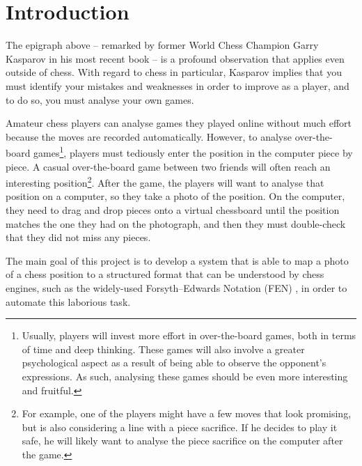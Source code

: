 \documentclass[../main.tex]{subfiles}
\begin{document}
\chapter{Introduction}

The epigraph above -- remarked by former World Chess Champion Garry Kasparov in his most recent book \cite{kasparov2018} -- is a profound observation that applies even outside of chess.
With regard to chess in particular, Kasparov implies that you must identify your mistakes and weaknesses in order to improve as a player, and to do so, you must analyse your own games. 

Amateur chess players can analyse games they played online without much effort because the moves are recorded automatically.
However, to analyse over-the-board games\footnote{Usually, players will invest more effort in over-the-board games, both in terms of time and deep thinking. These games will also involve a greater psychological aspect as a result of being able to observe the opponent's expressions. As such, analysing these games should be even more interesting and fruitful.}, players must tediously enter the position in the computer piece by piece.
A casual over-the-board game between two friends will often reach an interesting position\footnote{For example, one of the players might have a few moves that look promising, but is also considering a line with a piece sacrifice. If he decides to play it safe, he will likely want to analyse the piece sacrifice on the computer after the game.}. 
After the game, the players will want to analyse that position on a computer, so they take a photo of the position. 
On the computer, they need to drag and drop pieces onto a virtual chessboard until the position matches the one they had on the photograph, and then they must double-check that they did not miss any pieces.

The main goal of this project is to develop a system that is able to map a photo of a chess position to a structured format that can be understood by chess engines, such as the widely-used Forsyth–Edwards Notation (FEN) \cite{edwards1994}, in order to automate this laborious task.





\end{document}
